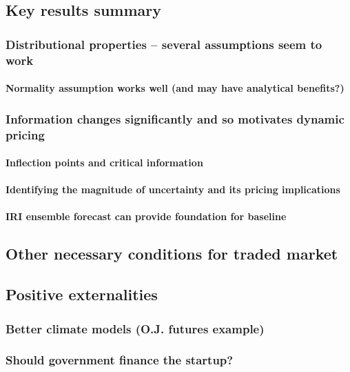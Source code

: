 \documentclass[authoryear]{article}
\begin{document}
\subsection{Key results summary}

\subsubsection{Distributional properties – several assumptions seem to work}

\paragraph{Normality assumption works well (and may have analytical benefits?)}

\subsubsection{Information changes significantly and so motivates dynamic pricing}

\paragraph{Inflection points and critical information}

\paragraph{Identifying the magnitude of uncertainty and its pricing implications}

\paragraph{IRI ensemble forecast can provide foundation for baseline}

\subsection{Other necessary conditions for traded market}

\subsection{Positive externalities}

\subsubsection{Better climate models (O.J. futures example)}

\subsubsection{Should government finance the startup?}



\end{document}
